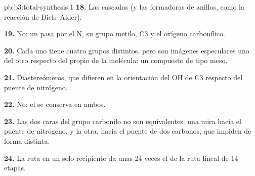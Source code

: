 \begin{solution}{pb:b3:total-synthesis:1}
\textbf{18.} Las cascadas (y las  formadoras de anillos, como la reacción de
Diels--Alder).

\textbf{19.} No: un  pasa por el N, su grupo metilo, C3 y el oxígeno
carbonílico.

\textbf{20.} Cada uno tiene cuatro grupos distintos, pero son imágenes especulares uno del otro respecto del
propio  de la molécula: un compuesto de tipo meso.

\textbf{21.} Diastereómeros, que difieren en la orientación del OH de C3 respecto del
puente de nitrógeno.

\textbf{22.} No: el  se conserva en ambos.

\textbf{23.} Las dos caras del grupo carbonilo no son equivalentes: una mira hacia el
puente de nitrógeno, y la otra, hacia el puente de dos carbonos, que impiden de forma distinta.

\textbf{24.} La ruta en un solo recipiente da unas 24 veces el  de la ruta lineal de 14
etapas.
\end{solution}

